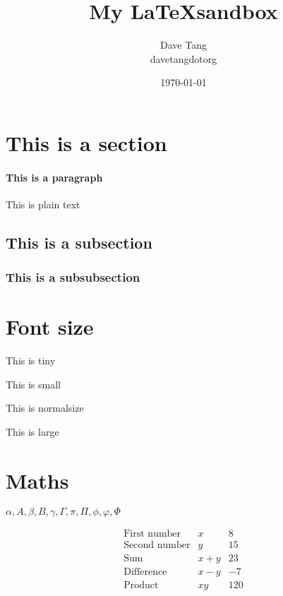 \documentclass[a4paper, 12pt]{article}
\begin{document}
\title{My \LaTeX sandbox}
\date{\today}
\author{Dave Tang\\ davetangdotorg}
\maketitle


\section{This is a section}

\paragraph{This is a paragraph}

This is plain text

\subsection{This is a subsection}

\subsubsection{This is a subsubsection}

\section{Font size}

\tiny{This is tiny}

\small{This is small}

\normalsize{This is normalsize}

\large{This is large}

\section{Maths}

$\alpha, A, \beta, B, \gamma, \Gamma, \pi, \Pi, \phi, \varphi, \Phi$

\[ \begin{array}{lcr}
\mbox{First number} & x & 8 \\
\mbox{Second number} & y & 15 \\
\mbox{Sum} & x + y & 23 \\
\mbox{Difference} & x - y & -7 \\
\mbox{Product} & xy & 120 \end{array}\] 
\end{document}
